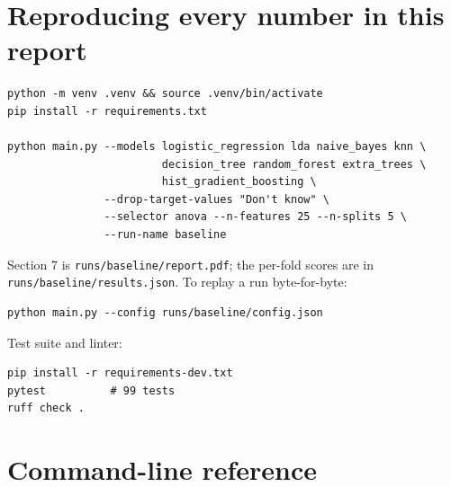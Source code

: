 \documentclass[11pt,a4paper]{article}
\begin{document}
\appendix
\section{Reproducing every number in this report}

\begin{lstlisting}[style=sh]
python -m venv .venv && source .venv/bin/activate
pip install -r requirements.txt

python main.py --models logistic_regression lda naive_bayes knn \
                        decision_tree random_forest extra_trees \
                        hist_gradient_boosting \
               --drop-target-values "Don't know" \
               --selector anova --n-features 25 --n-splits 5 \
               --run-name baseline
\end{lstlisting}

Section 7 is \texttt{runs/baseline/report.pdf}; the per-fold scores are in
\texttt{runs/baseline/results.json}. To replay a run byte-for-byte:

\begin{lstlisting}[style=sh]
python main.py --config runs/baseline/config.json
\end{lstlisting}

Test suite and linter:

\begin{lstlisting}[style=sh]
pip install -r requirements-dev.txt
pytest          # 99 tests
ruff check .
\end{lstlisting}

\section{Command-line reference}
\markboth{Appendix B}{}
\end{document}
